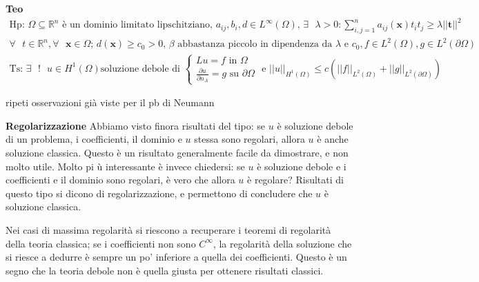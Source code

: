 \documentclass{article}
\begin{document}
\textbf{Teo}%
\begin{gather*}
\text{Hp: }\Omega \subseteq 
\mathbb{R}
^{n}\text{ \`{e} un dominio limitato lipschitziano, }a_{ij},b_{i},d\in
L^{\infty }\left( \Omega \right) \text{, }\exists \text{ }\lambda
>0:\sum_{i,j=1}^{n}a_{ij}\left( \mathbf{x}\right) t_{i}t_{j}\geq \lambda
\left\vert \left\vert \mathbf{t}\right\vert \right\vert ^{2}\text{ } \\
\forall \text{ }t\in 
\mathbb{R}
^{n},\forall \text{ }\mathbf{x}\in \Omega \text{; }d\left( \mathbf{x}\right)
\geq c_{0}>0\text{, }\beta \text{ abbastanza piccolo in dipendenza da }%
\lambda \text{ e }c_{0},f\in L^{2}\left( \Omega \right) ,g\in L^{2}\left(
\partial \Omega \right) \\
\text{Ts: }\exists \text{ }!\text{ }u\in H^{1}\left( \Omega \right) \text{
soluzione debole di }\left\{ 
\begin{array}{c}
Lu=f\text{ in }\Omega \\ 
\frac{\partial u}{\partial n_{A}}=g\text{ su }\partial \Omega%
\end{array}%
\right. \text{ e }\left\vert \left\vert u\right\vert \right\vert
_{H^{1}\left( \Omega \right) }\leq c\left( \left\vert \left\vert
f\right\vert \right\vert _{L^{2}\left( \Omega \right) }+\left\vert
\left\vert g\right\vert \right\vert _{L^{2}\left( \partial \Omega \right)
}\right)
\end{gather*}

ripeti osservazioni gi\`{a} viste per il pb di Neumann

\textbf{Regolarizzazione} Abbiamo visto finora risultati del tipo: se $u$ 
\`{e} soluzione debole di un problema, i coefficienti, il dominio e $u$
stessa sono regolari, allora $u$ \`{e} anche soluzione classica. Questo \`{e}
un risultato generalmente facile da dimostrare, e non molto utile. Molto pi%
\`{u} interessante \`{e} invece chiedersi: se $u$ \`{e} soluzione debole e i
coefficienti e il dominio sono regolari, \`{e} vero che allora $u$ \`{e}
regolare? Risultati di questo tipo si dicono di regolarizzazione, e
permettono di concludere che $u$ \`{e} soluzione classica.

Nei casi di massima regolarit\`{a} si riescono a recuperare i teoremi di
regolarit\`{a} della teoria classica; se i coefficienti non sono $C^{\infty
} $, la regolarit\`{a} della soluzione che si riesce a dedurre \`{e} sempre
un po' inferiore a quella dei coefficienti. Questo \`{e} un segno che la
teoria debole non \`{e} quella giusta per ottenere risultati classici.
\end{document}
